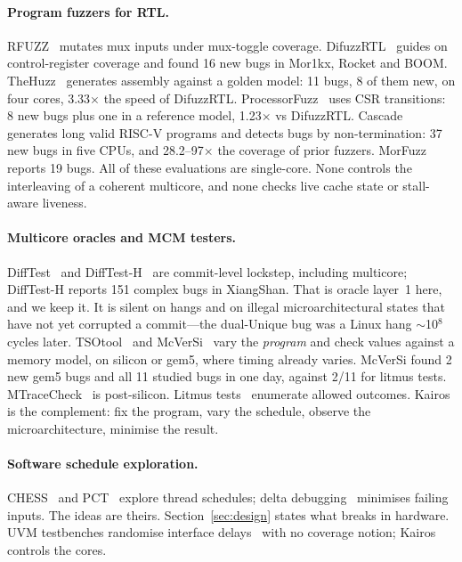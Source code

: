 \documentclass[sigconf,anonymous,review]{acmart}
\begin{document}
\paragraph{Program fuzzers for RTL.}
RFUZZ~\cite{laeufer2018rfuzz} mutates mux inputs under mux-toggle
coverage. DifuzzRTL~\cite{hur2021difuzzrtl} guides on control-register
coverage and found 16 new bugs in Mor1kx, Rocket and BOOM.
TheHuzz~\cite{kande2022thehuzz} generates assembly against a golden
model: 11 bugs, 8 of them new, on four cores, 3.33$\times$ the speed of
DifuzzRTL. ProcessorFuzz~\cite{canakci2023processorfuzz} uses CSR
transitions: 8 new bugs plus one in a reference model, 1.23$\times$ vs
DifuzzRTL. Cascade~\cite{solt2024cascade} generates long valid RISC-V
programs and detects bugs by non-termination: 37 new bugs in
five CPUs, and 28.2--97$\times$ the coverage of prior fuzzers.
MorFuzz~\cite{xu2023morfuzz} reports 19 bugs. All of these
evaluations are single-core. None controls the interleaving of a
coherent multicore, and none checks live cache state or stall-aware
liveness.

\paragraph{Multicore oracles and MCM testers.}
DiffTest~\cite{xu2022xiangshan} and DiffTest-H~\cite{ma2025difftesth}
are commit-level lockstep, including multicore; DiffTest-H reports 151
complex bugs in XiangShan. That is oracle layer~1 here, and we keep
it. It is silent on hangs and on illegal microarchitectural states
that have not yet corrupted a commit---the dual-Unique bug was a
Linux hang $\sim$10$^8$ cycles later. TSOtool~\cite{hangal2004tsotool}
and McVerSi~\cite{elver2016mcversi} vary the \emph{program} and check
values against a memory model, on silicon or gem5, where timing
already varies. McVerSi found 2 new gem5 bugs and all 11 studied bugs
in one day, against 2/11 for litmus tests. MTraceCheck~\cite{lee2017mtracecheck}
is post-silicon. Litmus tests~\cite{alglave2014herding} enumerate
allowed outcomes. Kairos is the complement: fix the program, vary the
schedule, observe the microarchitecture, minimise the result.

\paragraph{Software schedule exploration.}
CHESS~\cite{musuvathi2007chess,musuvathi2008chess} and
PCT~\cite{burckhardt2010pct} explore thread schedules; delta
debugging~\cite{zeller2002ddmin} minimises failing inputs. The ideas
are theirs. Section~\ref{sec:design} states what breaks in hardware.
UVM testbenches randomise interface delays~\cite{ieee1800uvm} with no
coverage notion; Kairos controls the cores.
\end{document}
